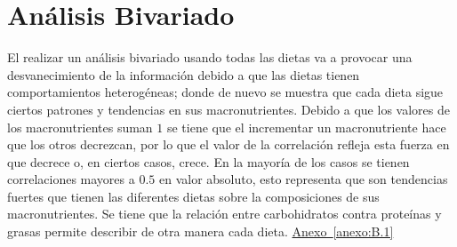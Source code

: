 \documentclass[12pt,a4paper]{article}
\newcommand{\anexoref}[1]{%
    \hyperref[#1]{Anexo~\ref*{#1} \nameref*{#1}}%
}
\begin{document}
    \section{Análisis Bivariado}\label{sec:biva}
    {
        El realizar un análisis bivariado usando todas las dietas va a 
        provocar una desvanecimiento de la información debido a que las dietas 
        tienen comportamientos heterogéneas; 
        donde de nuevo se muestra que cada dieta sigue ciertos patrones 
        y tendencias en sus macronutrientes. Debido a que los valores 
        de los macronutrientes suman $1$ se tiene que el incrementar 
        un macronutriente hace que los otros decrezcan, por lo que el 
        valor de la correlación refleja esta fuerza en que decrece o, 
        en ciertos casos, crece. En la mayoría de los casos se tienen 
        correlaciones mayores a $0.5$ en valor absoluto, esto representa 
        que son tendencias fuertes que tienen las diferentes dietas sobre 
        la composiciones de sus macronutrientes. Se tiene que la relación 
        entre carbohidratos contra proteínas y grasas permite describir de 
        otra manera cada dieta. \anexoref{anexo:B.1}

}
\end{document}
